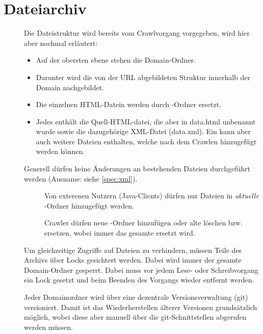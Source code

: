 \section{Dateiarchiv} \label{spec:filearchive}
\begin{description}
	\item []
		Die Dateistruktur wird bereits vom Crawlvorgang vorgegeben, wird hier aber nochmal erläutert:
		\begin{itemize}
			\item Auf der obersten ebene stehen die Domain-Ordner.
			\item Darunter wird die von der URL abgebildeten Struktur
				innerhalb der Domain nachgebildet.
			\item Die einzelnen HTML-Datein werden durch \htmlarc-Ordner ersetzt.
			\item Jedes \htmlarc enthält die Quell-HTML-datei, 
				die aber in data.html unbenannt wurde
				sowie die dazugehörige XML-Datei (data.xml). 
				Ein \htmlarc kann aber auch weitere Dateien enthalten, welche nach dem
				Crawlen hinzugefügt werden können.
		\end{itemize}
	\item []
		Generell dürfen keine Änderungen an bestehenden Dateien durchgeführt werden 
		(Ausname: siehe \ref{spec:xml}).
		\begin{description}
			\item []
				Von exterenen Nutzern (Java-Clients) dürfen nur Dateien in \emph{aktuelle} \htmlarc-Ordner
				hinzugefügt werden.
			\item []
				Crawler dürfen neue \htmlarc-Ordner hinzufügen oder alte löschen bzw. ersetzen, 
				wobei immer das gesamte \htmlarc ersetzt wird. 
		\end{description}
	\item []
		Um gleichzeitige Zugriffe auf Dateien zu verhindern, 
		müssen Teile des Archivs über Locks gesichtert werden.
		Dabei wird immer der gesamte Domain-Ordner gesperrt.
		Dabei muss vor jedem Lese- oder Schreibvorgang ein Lock gesetzt und
		beim Beenden des Vorgangs wieder entfernt werden.
	\item []	
		Jeder Domainordner wird über eine dezentrale Versionsverwaltung (git) versioniert. 
		Damit ist das Wiederherstellen älterer Versionen grundsätzlich möglich,
		wobei diese aber manuell über die git-Schnittstellen abgerufen werden müssen.

\end{description}
